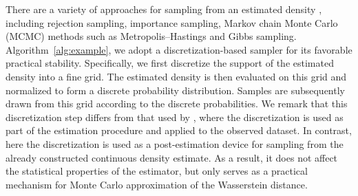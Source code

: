 \documentclass{article}
\theoremstyle{plain}
\theoremstyle{definition}
\theoremstyle{plain}
\begin{document}
There are a variety of approaches for sampling from an estimated density \parencite{robert1999monte}, including rejection sampling, importance sampling,
Markov chain Monte Carlo (MCMC) methods such as Metropolis--Hastings and
Gibbs sampling.
Algorithm~\ref{alg:example}, we adopt a discretization-based sampler for its favorable practical stability. 
Specifically, we first discretize the support of the estimated
density into a fine grid. The estimated density is then evaluated on this grid
and normalized to form a discrete probability distribution. Samples are subsequently drawn from this grid according to the discrete probabilities.
We remark that this discretization step differs from that used by \parencite{lin2025estimation}, where the discretization is used as part of the estimation procedure and applied to the observed dataset. 
In contrast, here the discretization is used as a post-estimation device for sampling from the already constructed
continuous density estimate. 
As a result, it does not affect the statistical properties of the estimator, but only serves as a practical mechanism for
Monte Carlo approximation of the Wasserstein distance.
\end{document}
